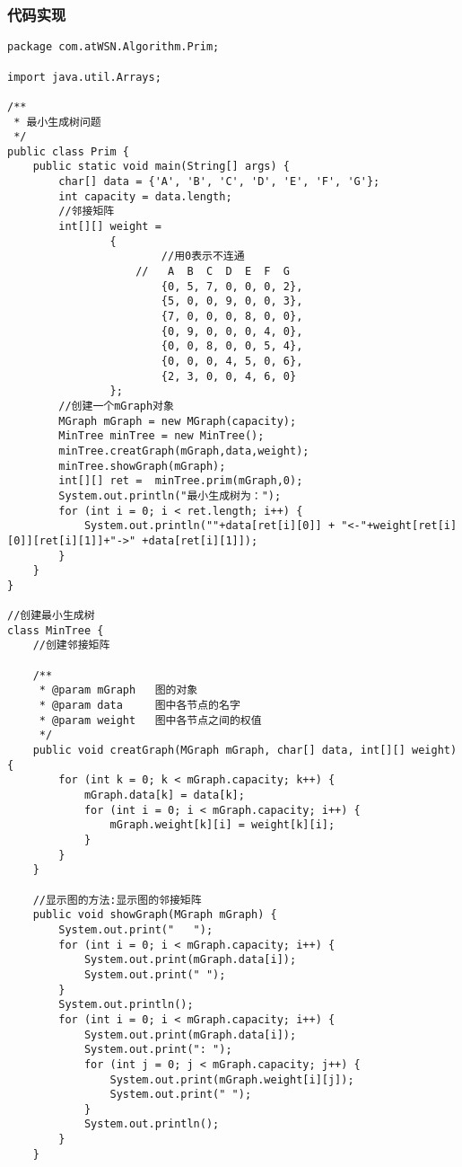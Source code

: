 \documentclass[a4paper]{report}
\begin{document}
\subsubsection{代码实现}
\begin{lstlisting}
package com.atWSN.Algorithm.Prim;

import java.util.Arrays;

/**
 * 最小生成树问题
 */
public class Prim {
    public static void main(String[] args) {
        char[] data = {'A', 'B', 'C', 'D', 'E', 'F', 'G'};
        int capacity = data.length;
        //邻接矩阵
        int[][] weight =
                {
                        //用0表示不连通
                    //   A  B  C  D  E  F  G
                        {0, 5, 7, 0, 0, 0, 2},
                        {5, 0, 0, 9, 0, 0, 3},
                        {7, 0, 0, 0, 8, 0, 0},
                        {0, 9, 0, 0, 0, 4, 0},
                        {0, 0, 8, 0, 0, 5, 4},
                        {0, 0, 0, 4, 5, 0, 6},
                        {2, 3, 0, 0, 4, 6, 0}
                };
        //创建一个mGraph对象
        MGraph mGraph = new MGraph(capacity);
        MinTree minTree = new MinTree();
        minTree.creatGraph(mGraph,data,weight);
        minTree.showGraph(mGraph);
        int[][] ret =  minTree.prim(mGraph,0);
        System.out.println("最小生成树为：");
        for (int i = 0; i < ret.length; i++) {
            System.out.println(""+data[ret[i][0]] + "<-"+weight[ret[i][0]][ret[i][1]]+"->" +data[ret[i][1]]);
        }
    }
}

//创建最小生成树
class MinTree {
    //创建邻接矩阵

    /**
     * @param mGraph   图的对象
     * @param data     图中各节点的名字
     * @param weight   图中各节点之间的权值
     */
    public void creatGraph(MGraph mGraph, char[] data, int[][] weight) {
        for (int k = 0; k < mGraph.capacity; k++) {
            mGraph.data[k] = data[k];
            for (int i = 0; i < mGraph.capacity; i++) {
                mGraph.weight[k][i] = weight[k][i];
            }
        }
    }

    //显示图的方法:显示图的邻接矩阵
    public void showGraph(MGraph mGraph) {
        System.out.print("   ");
        for (int i = 0; i < mGraph.capacity; i++) {
            System.out.print(mGraph.data[i]);
            System.out.print(" ");
        }
        System.out.println();
        for (int i = 0; i < mGraph.capacity; i++) {
            System.out.print(mGraph.data[i]);
            System.out.print(": ");
            for (int j = 0; j < mGraph.capacity; j++) {
                System.out.print(mGraph.weight[i][j]);
                System.out.print(" ");
            }
            System.out.println();
        }
    }


\end{lstlisting}
\end{document}
